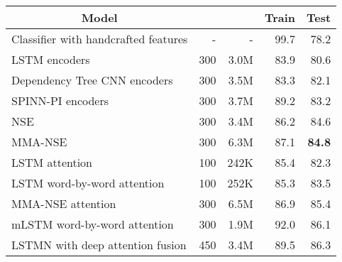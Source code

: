 \documentclass{article}
\begin{document}
\begin{table*}[t]
\begin{center}
\small
\begin{tabular}{c|c|c|c|c}
\hline 
Model &  &  & Train	& Test \\
\hline
\multicolumn{1}{l|}{Classifier with handcrafted features \cite{bowman:15}} & \multicolumn{1}{|r|}{-} & \multicolumn{1}{|r|}{-} & \multicolumn{1}{|r|}{99.7} & \multicolumn{1}{|r}{78.2} \\
\hline
\multicolumn{1}{l|}{LSTM encoders \cite{bowman:15}} & \multicolumn{1}{|r|}{300} & \multicolumn{1}{|r|}{3.0M} & \multicolumn{1}{|r|}{83.9} & \multicolumn{1}{|r}{80.6} \\
\multicolumn{1}{l|}{Dependency Tree CNN encoders \cite{Lili16}} & \multicolumn{1}{|r|}{300} & \multicolumn{1}{|r|}{3.5M} & \multicolumn{1}{|r|}{83.3} & \multicolumn{1}{|r}{82.1} \\
\multicolumn{1}{l|}{SPINN-PI encoders \cite{BowmanGRGMP16}} & \multicolumn{1}{|r|}{300} & \multicolumn{1}{|r|}{3.7M} & \multicolumn{1}{|r|}{89.2} & \multicolumn{1}{|r}{83.2} \\
\multicolumn{1}{l|}{NSE} & \multicolumn{1}{|r|}{300} & \multicolumn{1}{|r|}{3.4M} & \multicolumn{1}{|r|}{86.2} & \multicolumn{1}{|r}{84.6} \\ \multicolumn{1}{l|}{MMA-NSE} & \multicolumn{1}{|r|}{300} & \multicolumn{1}{|r|}{6.3M} & \multicolumn{1}{|r|}{87.1} & \multicolumn{1}{|r}{\textbf{84.8}} \\ \hline
\multicolumn{1}{l|}{LSTM attention \cite{rocktaschel:16}} & \multicolumn{1}{|r|}{100} & \multicolumn{1}{|r|}{242K} & \multicolumn{1}{|r|}{85.4} & \multicolumn{1}{|r}{82.3} \\
\multicolumn{1}{l|}{LSTM word-by-word attention \cite{rocktaschel:16}} & \multicolumn{1}{|r|}{100} & \multicolumn{1}{|r|}{252K} & \multicolumn{1}{|r|}{85.3} & \multicolumn{1}{|r}{83.5} \\
\multicolumn{1}{l|}{MMA-NSE attention} & \multicolumn{1}{|r|}{300} & \multicolumn{1}{|r|}{6.5M} & \multicolumn{1}{|r|}{86.9} & \multicolumn{1}{|r}{85.4} \\ \multicolumn{1}{l|}{mLSTM word-by-word attention \cite{WangJ15b}} & \multicolumn{1}{|r|}{300} & \multicolumn{1}{|r|}{1.9M} & \multicolumn{1}{|r|}{92.0} & \multicolumn{1}{|r}{86.1} \\
\multicolumn{1}{l|}{LSTMN with deep attention fusion \cite{ChengDL16}} & \multicolumn{1}{|r|}{450} & \multicolumn{1}{|r|}{3.4M} & \multicolumn{1}{|r|}{89.5} & \multicolumn{1}{|r}{86.3} \\

\end{tabular}
\end{center}
\end{table*}
\end{document}

